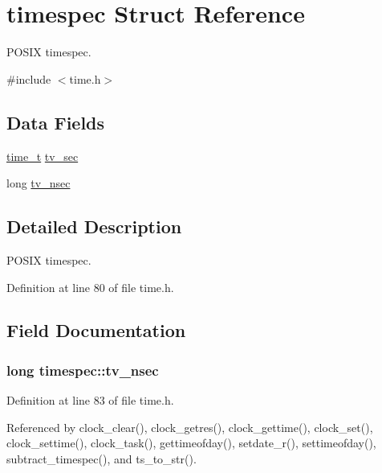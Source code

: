 \hypertarget{structtimespec}{}\section{timespec Struct Reference}
\label{structtimespec}


P\+O\+S\+IX timespec.  




{\ttfamily \#include $<$time.\+h$>$}

\subsection*{Data Fields}
\begin{DoxyCompactItemize}
\item 
\hyperlink{time_8h_a3346b04b0420b32ccf6b706551b70762}{time\+\_\+t} \hyperlink{structtimespec_afc3302668d7cb5952f590da69fdd4955}{tv\+\_\+sec}
\item 
long \hyperlink{structtimespec_ae3c7510dafa8cbcaede866ed13c99683}{tv\+\_\+nsec}
\end{DoxyCompactItemize}


\subsection{Detailed Description}
P\+O\+S\+IX timespec. 

Definition at line 80 of file time.\+h.



\subsection{Field Documentation}
\subsubsection[{\texorpdfstring{tv\+\_\+nsec}{tv_nsec}}]{\setlength{\rightskip}{0pt plus 5cm}long timespec\+::tv\+\_\+nsec}\hypertarget{structtimespec_ae3c7510dafa8cbcaede866ed13c99683}{}\label{structtimespec_ae3c7510dafa8cbcaede866ed13c99683}


Definition at line 83 of file time.\+h.



Referenced by clock\+\_\+clear(), clock\+\_\+getres(), clock\+\_\+gettime(), clock\+\_\+set(), clock\+\_\+settime(), clock\+\_\+task(), gettimeofday(), setdate\+\_\+r(), settimeofday(), subtract\+\_\+timespec(), and ts\+\_\+to\+\_\+str().

